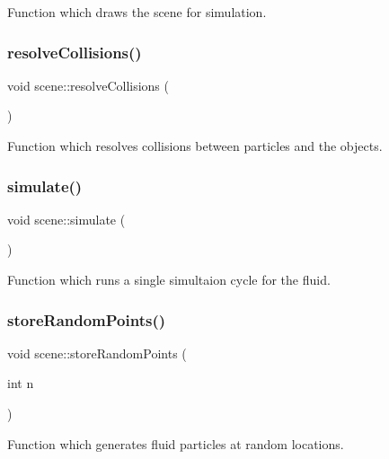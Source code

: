 Function which draws the scene for simulation. 

\hypertarget{classscene_a18bf271763888eeb42d7155bdd2fc8b7}{}\label{classscene_a18bf271763888eeb42d7155bdd2fc8b7} 
\subsubsection{\texorpdfstring{resolve\+Collisions()}{resolveCollisions()}}
{\footnotesize\ttfamily void scene\+::resolve\+Collisions (\begin{DoxyParamCaption}{ }\end{DoxyParamCaption})}



Function which resolves collisions between particles and the objects. 

\hypertarget{classscene_a3ff4def77367913f3e972d709676269b}{}\label{classscene_a3ff4def77367913f3e972d709676269b} 
\subsubsection{\texorpdfstring{simulate()}{simulate()}}
{\footnotesize\ttfamily void scene\+::simulate (\begin{DoxyParamCaption}{ }\end{DoxyParamCaption})}



Function which runs a single simultaion cycle for the fluid. 

\hypertarget{classscene_ada443dbbf28ef6094bd4fe15f1db5b17}{}\label{classscene_ada443dbbf28ef6094bd4fe15f1db5b17} 
\subsubsection{\texorpdfstring{store\+Random\+Points()}{storeRandomPoints()}}
{\footnotesize\ttfamily void scene\+::store\+Random\+Points (\begin{DoxyParamCaption}\item[{int}]{n }\end{DoxyParamCaption})}



Function which generates fluid particles at random locations. 



